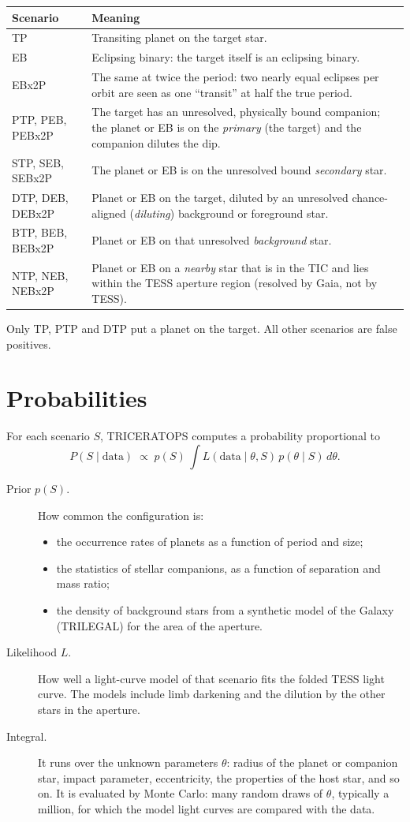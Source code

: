 \documentclass[11pt,a4paper]{report}
\begin{document}
\begin{longtable}{@{}p{}p{}@{}}
\toprule
\textbf{Scenario} & \textbf{Meaning}\\
\midrule\endhead
TP & Transiting planet on the target star.\\
EB & Eclipsing binary: the target itself is an eclipsing binary.\\
EBx2P & The same at twice the period: two nearly equal eclipses per orbit are seen as one ``transit'' at half the true period.\\
PTP, PEB, PEBx2P & The target has an unresolved, physically bound companion; the planet or EB is on the \emph{primary} (the target) and the companion dilutes the dip.\\
STP, SEB, SEBx2P & The planet or EB is on the unresolved bound \emph{secondary} star.\\
DTP, DEB, DEBx2P & Planet or EB on the target, diluted by an unresolved chance-aligned (\emph{diluting}) background or foreground star.\\
BTP, BEB, BEBx2P & Planet or EB on that unresolved \emph{background} star.\\
NTP, NEB, NEBx2P & Planet or EB on a \emph{nearby} star that is in the TIC and lies within the TESS aperture region (resolved by Gaia, not by TESS).\\
\bottomrule
\end{longtable}

Only TP, PTP and DTP put a planet on the target. All other scenarios are
false positives.

\section{Probabilities}

For each scenario $S$, TRICERATOPS computes a probability proportional to
\[
P(S \mid \text{data}) \;\propto\; p(S)\,\int L(\text{data}\mid\theta,S)\,p(\theta\mid S)\,d\theta .
\]
\begin{description}
\item[Prior $p(S)$.] How common the configuration is:
\begin{itemize}
\item the occurrence rates of planets as a function of period and size;
\item the statistics of stellar companions, as a function of separation and
mass ratio;
\item the density of background stars from a synthetic model of the Galaxy
(TRILEGAL) for the area of the aperture.
\end{itemize}
\item[Likelihood $L$.] How well a light-curve model of that scenario fits the
folded TESS light curve. The models include limb darkening and the dilution by
the other stars in the aperture.
\item[Integral.] It runs over the unknown parameters $\theta$: radius of the
planet or companion star, impact parameter, eccentricity, the properties of
the host star, and so on. It is evaluated by Monte Carlo: many random draws
of $\theta$, typically a million, for which the model light curves are
compared with the data.
\end{description}
\end{document}
